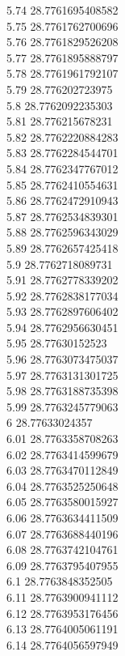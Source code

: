 {5.74	28.7761695408582\\
5.75	28.7761762700696\\
5.76	28.7761829526208\\
5.77	28.7761895888797\\
5.78	28.7761961792107\\
5.79	28.776202723975\\
5.8	28.7762092235303\\
5.81	28.776215678231\\
5.82	28.7762220884283\\
5.83	28.7762284544701\\
5.84	28.7762347767012\\
5.85	28.7762410554631\\
5.86	28.7762472910943\\
5.87	28.7762534839301\\
5.88	28.7762596343029\\
5.89	28.7762657425418\\
5.9	28.7762718089731\\
5.91	28.7762778339202\\
5.92	28.7762838177034\\
5.93	28.7762897606402\\
5.94	28.7762956630451\\
5.95	28.77630152523\\
5.96	28.7763073475037\\
5.97	28.7763131301725\\
5.98	28.7763188735398\\
5.99	28.7763245779063\\
6	28.77633024357\\
6.01	28.7763358708263\\
6.02	28.7763414599679\\
6.03	28.7763470112849\\
6.04	28.7763525250648\\
6.05	28.7763580015927\\
6.06	28.7763634411509\\
6.07	28.7763688440196\\
6.08	28.7763742104761\\
6.09	28.7763795407955\\
6.1	28.7763848352505\\
6.11	28.7763900941112\\
6.12	28.7763953176456\\
6.13	28.7764005061191\\
6.14	28.7764056597949\\
}
